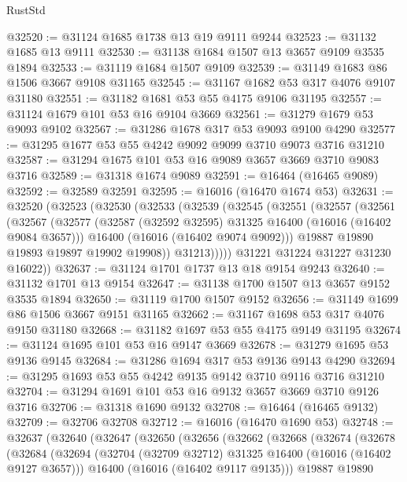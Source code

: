 \begin{lexlean}{RustStd}
\begin{coremodule}
@32520 := @31124 @1685 @1738 @13 @19 @9111 @9244
@32523 := @31132 @1685 @13 @9111
@32530 := @31138 @1684 @1507 @13 @3657 @9109 @3535 @1894
@32533 := @31119 @1684 @1507 @9109
@32539 := @31149 @1683 @86 @1506 @3667 @9108 @31165
@32545 := @31167 @1682 @53 @317 @4076 @9107 @31180
@32551 := @31182 @1681 @53 @55 @4175 @9106 @31195
@32557 := @31124 @1679 @101 @53 @16 @9104 @3669
@32561 := @31279 @1679 @53 @9093 @9102
@32567 := @31286 @1678 @317 @53 @9093 @9100 @4290
@32577 := @31295 @1677 @53 @55 @4242 @9092 @9099 @3710 @9073 @3716 @31210
@32587 := @31294 @1675 @101 @53 @16 @9089 @3657 @3669 @3710 @9083 @3716
@32589 := @31318 @1674 @9089
@32591 := @16464 (@16465 @9089)
@32592 := @32589 @32591
@32595 := @16016 (@16470 @1674 @53)
@32631 := @32520
    (@32523
      (@32530
        (@32533
          (@32539
            (@32545
              (@32551
                (@32557
                  (@32561
                    (@32567
                      (@32577
                        (@32587 (@32592 @32595) @31325 @16400 (@16016 (@16402 @9084 @3657)))
                        @16400
                        (@16016 (@16402 @9074 @9092)))
                      @19887
                      @19890
                      @19893
                      @19897
                      @19902
                      @19908))
                  @31213)))))
        @31221
        @31224
        @31227
        @31230
        @16022))
@32637 := @31124 @1701 @1737 @13 @18 @9154 @9243
@32640 := @31132 @1701 @13 @9154
@32647 := @31138 @1700 @1507 @13 @3657 @9152 @3535 @1894
@32650 := @31119 @1700 @1507 @9152
@32656 := @31149 @1699 @86 @1506 @3667 @9151 @31165
@32662 := @31167 @1698 @53 @317 @4076 @9150 @31180
@32668 := @31182 @1697 @53 @55 @4175 @9149 @31195
@32674 := @31124 @1695 @101 @53 @16 @9147 @3669
@32678 := @31279 @1695 @53 @9136 @9145
@32684 := @31286 @1694 @317 @53 @9136 @9143 @4290
@32694 := @31295 @1693 @53 @55 @4242 @9135 @9142 @3710 @9116 @3716 @31210
@32704 := @31294 @1691 @101 @53 @16 @9132 @3657 @3669 @3710 @9126 @3716
@32706 := @31318 @1690 @9132
@32708 := @16464 (@16465 @9132)
@32709 := @32706 @32708
@32712 := @16016 (@16470 @1690 @53)
@32748 := @32637
    (@32640
      (@32647
        (@32650
          (@32656
            (@32662
              (@32668
                (@32674
                  (@32678
                    (@32684
                      (@32694
                        (@32704 (@32709 @32712) @31325 @16400 (@16016 (@16402 @9127 @3657)))
                        @16400
                        (@16016 (@16402 @9117 @9135)))
                      @19887
                      @19890

\end{coremodule}
\end{lexlean}
